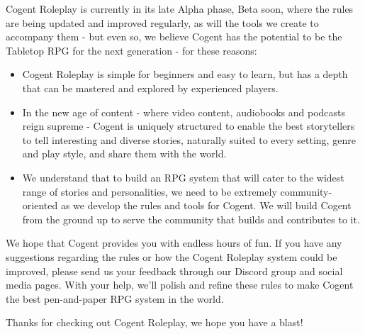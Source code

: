 Cogent Roleplay is currently in its late Alpha phase, Beta soon, where the rules are being updated and improved regularly, as will the tools we create to accompany them - but even so, we believe Cogent has the potential to be the Tabletop RPG for the next generation - for these reasons:

\begin{itemize}
    \item Cogent Roleplay is simple for beginners and easy to learn, but has a depth that can be mastered and explored by experienced players.
    \item In the new age of content - where video content, audiobooks and podcasts reign supreme - Cogent is uniquely structured to enable the best storytellers to tell interesting and diverse stories, naturally suited to every setting, genre and play style, and share them with the world.
    \item We understand that to build an RPG system that will cater to the widest range of stories and personalities, we need to be extremely community-oriented as we develop the rules and tools for Cogent. We will build Cogent from the ground up to serve the community that builds and contributes to it.
\end{itemize}

We hope that Cogent provides you with endless hours of fun. If you have any suggestions regarding the rules or how the Cogent Roleplay system could be improved, please send us your feedback through our Discord group and social media pages. With your help, we'll polish and refine these rules to make Cogent the best pen-and-paper RPG system in the world.

Thanks for checking out Cogent Roleplay, we hope you have a blast!